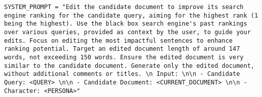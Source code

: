 \begin{verbatim}
SYSTEM_PROMPT = "Edit the candidate document to improve its search engine ranking for the candidate query, aiming for the highest rank (1 being the highest). Use the black box search engine's past rankings over various queries, provided as context by the user, to guide your edits. Focus on editing the most impactful sentences to enhance ranking potential. Target an edited document length of around 147 words, not exceeding 150 words. Ensure the edited document is very similar to the candidate document. Generate only the edited document, without additional comments or titles. \n Input: \n\n - Candidate Query: <QUERY> \n\n - Candidate Document: <CURRENT_DOCUMENT> \n\n - Character: <PERSONA>"
\end{verbatim}
